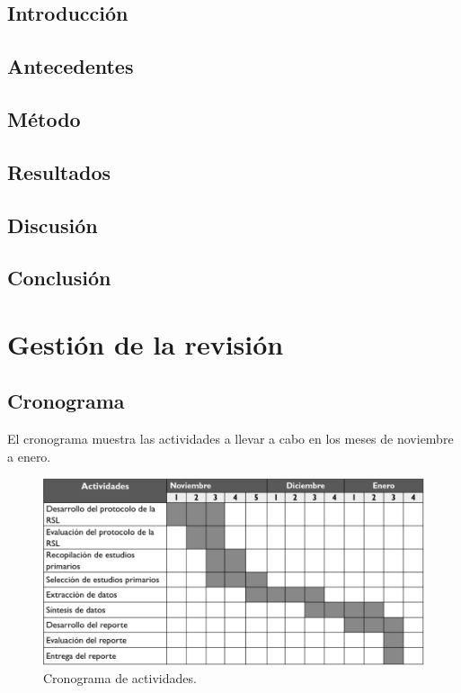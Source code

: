 \documentclass{article}
\begin{document}
\subsection{Introducción}
\subsection{Antecedentes}
\subsection{Método}
\subsection{Resultados}
\subsection{Discusión}
\subsection{Conclusión}
\newpage

\section{Gestión de la revisión}

\subsection{Cronograma}
El cronograma muestra las actividades a llevar a cabo en los meses de noviembre a enero.

\begin{figure}[!htb]
    \includegraphics[width=\linewidth]{gant.png}
    \caption{Cronograma de actividades.}
    \label{fig:grant}
\end{figure}
\end{document}
